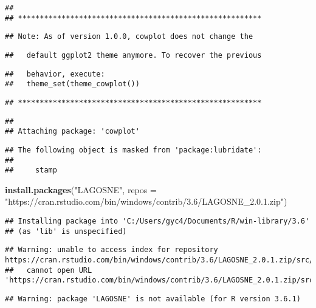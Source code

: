 \documentclass[]{article}
\newenvironment{Shaded}{\begin{snugshade}}{\end{snugshade}}
\newcommand{\DataTypeTok}[1]{\textcolor[rgb]{0.13,0.29,0.53}{#1}}
\newcommand{\KeywordTok}[1]{\textcolor[rgb]{0.13,0.29,0.53}{\textbf{#1}}}
\newcommand{\NormalTok}[1]{#1}
\newcommand{\StringTok}[1]{\textcolor[rgb]{0.31,0.60,0.02}{#1}}
\begin{document}
\begin{verbatim}
## 
## ********************************************************
\end{verbatim}

\begin{verbatim}
## Note: As of version 1.0.0, cowplot does not change the
\end{verbatim}

\begin{verbatim}
##   default ggplot2 theme anymore. To recover the previous
\end{verbatim}

\begin{verbatim}
##   behavior, execute:
##   theme_set(theme_cowplot())
\end{verbatim}

\begin{verbatim}
## ********************************************************
\end{verbatim}

\begin{verbatim}
## 
## Attaching package: 'cowplot'
\end{verbatim}

\begin{verbatim}
## The following object is masked from 'package:lubridate':
## 
##     stamp
\end{verbatim}

\begin{Shaded}
\begin{Highlighting}[]
\KeywordTok{install.packages}\NormalTok{(}\StringTok{"LAGOSNE"}\NormalTok{, }\DataTypeTok{repos =} \StringTok{"https://cran.rstudio.com/bin/windows/contrib/3.6/LAGOSNE_2.0.1.zip"}\NormalTok{)}
\end{Highlighting}
\end{Shaded}

\begin{verbatim}
## Installing package into 'C:/Users/gyc4/Documents/R/win-library/3.6'
## (as 'lib' is unspecified)
\end{verbatim}

\begin{verbatim}
## Warning: unable to access index for repository https://cran.rstudio.com/bin/windows/contrib/3.6/LAGOSNE_2.0.1.zip/src/contrib:
##   cannot open URL 'https://cran.rstudio.com/bin/windows/contrib/3.6/LAGOSNE_2.0.1.zip/src/contrib/PACKAGES'
\end{verbatim}

\begin{verbatim}
## Warning: package 'LAGOSNE' is not available (for R version 3.6.1)
\end{verbatim}
\end{document}
